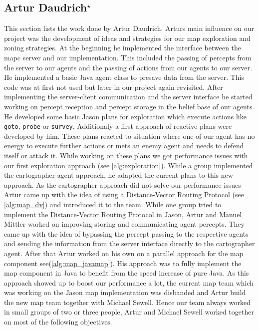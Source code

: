 \subsection[Artur Daudrich]{Artur Daudrich$^{\star}$}
This section lists the work done by Artur Daudrich.
Arturs main influence on our project was the development of ideas and strategies for our map exploration and zoning strategies.
At the beginning he implemented the interface between the mapc server and our implementation.
This included the passing of percepts from the server to our agents and the passing of actions from our agents to our server.
He implemented a basic Java agent class to presave data from the server.
This code was at first not used but later in our project again revisited.
After implementing the server-client communication and the server interface he started working on percept reception and percept storage in the belief base of our agents.
He developed some basic Jason plans for exploration which execute actions like \texttt{goto}, \texttt{probe} or \texttt{survey}.
Additionaly a first approach of reactive plans were developed by him.
These plans reacted to situation where one of our agent has no energy to execute further actions or mets an enemy agent and needs to defend itself or attack it.
While working on these plans we got performance issues with our first exploration approach (see \autoref{alg:exploration}).
While a group implemented the cartographer agent approach, he adapted the current plans to this new approach.
As the cartographer approach did not solve our performance issues Artur came up with the idea of using a Distance-Vector Routing Protocol (see \autoref{alg:map_dv}) and introduced it to the team.
While one group tried to implement the Distance-Vector Routing Protocol in Jason, Artur and Manuel Mittler worked on improving storing and communicating agent percepts.
They came up with the idea of bypassing the percept passing to the respective agents and sending the information from the server interface directly to the cartographer agent.
After that Artur worked on his own on a parallel approach for the map component see(\autoref{alg:map_javamap}).
His approach was to fully implement the map component in Java to benefit from the speed increase of pure Java.
As this approach showed up to boost our performance a lot, the current map team which was working on the Jason map implementation was disbanded and Artur build the new map team together with Michael Sewell.
Hence our team always worked in small groups of two or three people, Artur and Michael Sewell worked together on most of the following objectives.
